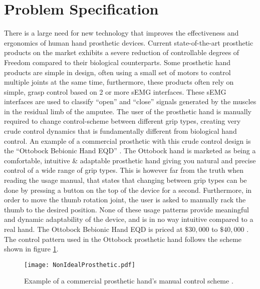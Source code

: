 \documentclass[../main.tex]{subfiles}
\begin{document}
\section{Problem Specification}

There is a large need for new technology that improves the effectiveness and ergonomics of human hand prosthetic devices.
Current state-of-the-art prosthetic products on the market exhibits a severe reduction of controllable degrees of Freedom compared to their biological counterparts.
Some prosthetic hand products are simple in design, often using a small set of motors to control multiple joints at the same time, furthermore, these products often rely on simple, grasp control based on 2 or more \gls{sEMG} interfaces.
These \gls{sEMG} interfaces are used to classify ``open'' and ``close'' signals generated by the muscles in the residual limb of the amputee.
The user of the prosthetic hand is manually required to change control-scheme between different grip types, creating very crude control dynamics that is fundamentally different from biological hand control.
An example of a commercial prosthetic with this crude control design is the ``Ottobock Bebionic Hand EQD'' \cite{ottobock}.
The Ottobock hand is marketed as being a comfortable, intuitive \& adaptable prosthetic hand giving you natural and precise control of a wide range of grip types.
This is however far from the truth when reading the usage manual, that states that changing between grip types can be done by pressing a button on the top of the device for a second.
Furthermore, in order to move the thumb rotation joint, the user is asked to manually rack the thumb to the desired position.
None of these usage patterns provide meaningful and dynamic adaptability of the device, and is in no way intuitive compared to a real hand.
The Ottobock Bebionic Hand EQD is priced at $\$30,000$ to $\$40,000$ \cite{ottobock-prices}.
The control pattern used in the Ottobock prosthetic hand follows the scheme shown in figure \ref{fig:nonidealprosthetic}.

\begin{figure}[H]
\begin{center}
\texttt{[image: NonIdealProsthetic.pdf]}
\caption{Example of a commercial prosthetic hand's manual control scheme \cite{ottobock}.}
\label{fig:nonidealprosthetic}
\end{center}
\end{figure}

\end{document}
